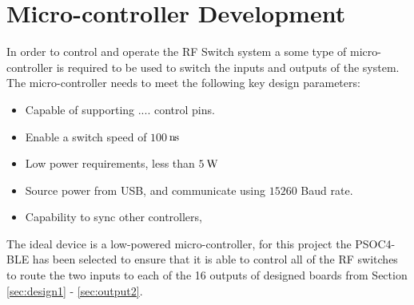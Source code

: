 \documentclass[12pt,openany,a4paper]{book}
\newcommand{\pack}	{\hspace{-0.08em}}
\newcommand{\ns}	{\ensuremath{\rm\,n\pack s}}
\newcommand{\W}		{\ensuremath{\rm\,W}}
\begin{document}
\section{Micro-controller Development}		\label{sec:micro_dev}
In order to control and operate the RF Switch system a some type of micro-controller is required to be used to switch the inputs and outputs of the system. The micro-controller needs to meet the following key design parameters:
\begin{itemize}
	\setlength\itemsep{-0.5em}
	\item Capable of supporting .... control pins.
	\item Enable a switch speed of $100$\ns
	\item Low power requirements, less than $5$\W
	\item Source power from USB, and communicate using $15260$ Baud rate.
	\item Capability to sync other controllers, 
\end{itemize}
The ideal device is a low-powered micro-controller, for this project the PSOC4-BLE has been selected to ensure that it is able to control all of the RF switches to route the two inputs to each of the 16 outputs of designed boards from Section \ref{sec:design1} - \ref{sec:output2}. 
\end{document}
